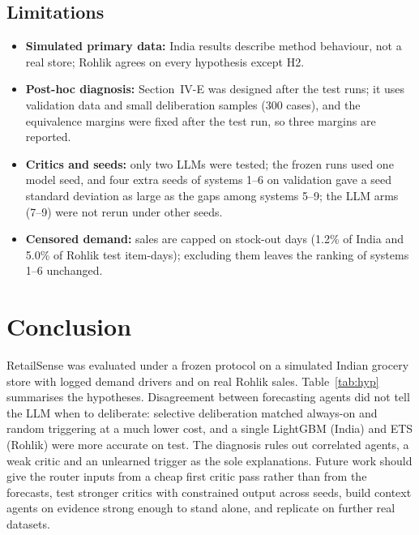 \documentclass[conference]{IEEEtran}
\begin{document}
\subsection{Limitations}
\begin{itemize}
\item \textbf{Simulated primary data:} India results describe method behaviour, not a real store;
Rohlik agrees on every hypothesis except H2.
\item \textbf{Post-hoc diagnosis:} Section~IV-E was designed after the test runs; it uses validation
data and small deliberation samples (300 cases), and the equivalence margins were fixed after the
test run, so three margins are reported.
\item \textbf{Critics and seeds:} only two LLMs were tested; the frozen runs used one model seed, and
four extra seeds of systems 1--6 on validation gave a seed standard deviation as large as the gaps
among systems 5--9; the LLM arms (7--9) were not rerun under other seeds.
\item \textbf{Censored demand:} sales are capped on stock-out days (1.2\% of India and 5.0\% of
Rohlik test item-days); excluding them leaves the ranking of systems 1--6 unchanged.
\end{itemize}

\section{Conclusion}\label{sec:conclusion}

RetailSense was evaluated under a frozen protocol on a simulated Indian grocery store with logged
demand drivers and on real Rohlik sales. Table~\ref{tab:hyp} summarises the hypotheses. Disagreement
between forecasting agents did not tell the LLM when to deliberate: selective deliberation matched
always-on and random triggering at a much lower cost, and a single LightGBM (India) and ETS
(Rohlik) were more accurate on test. The diagnosis rules out correlated agents, a weak critic and an
unlearned trigger as the sole explanations. Future work should give the router inputs from a cheap
first critic pass rather than from the forecasts, test stronger critics with constrained output
across seeds, build context agents on evidence strong enough to stand alone, and replicate on further
real datasets.
\end{document}

